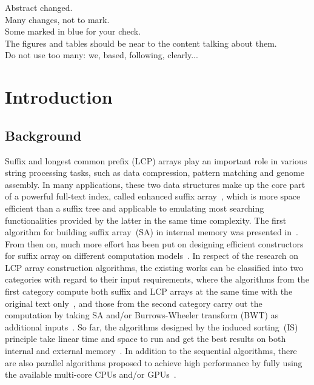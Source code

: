 \documentclass[10pt,journal,compsoc]{IEEEtran}
\begin{document}
\IEEEdisplaynontitleabstractindextext

\IEEEpeerreviewmaketitle

{\color{blue} 
Abstract changed. \\
Many changes, not to mark. \\
Some marked in blue for your check. \\
The figures and tables should be near to the content talking about them. \\
Do not use too many: we, based, following, clearly...  \\
}

\section{Introduction}\label{sec:introduction}

\subsection{Background} \label{sec:introduction:background}

Suffix and longest common prefix (LCP) arrays play an important role in various string processing tasks, such as data compression, pattern matching and genome assembly. In many applications, these two data structures make up the core part of a powerful full-text index, called enhanced suffix array~\cite{Abouelhodaa2004}, which is more space efficient than a suffix tree and applicable to emulating most searching functionalities provided by the latter in the same time complexity. The first algorithm for building suffix array~(SA) in internal memory was presented in~\cite{Manber1993}. From then on, much more effort has been put on designing efficient constructors for suffix array on different computation models~\cite{Karkkainen2003, Ko2003, Kim2003, Nong11, Dementiev2008, Ferragina2012, Manzini2004, Bingmann12, Karkkainen2014, Nong14, Nong15}. In respect of the research on LCP array construction algorithms, the existing works can be classified into two categories with regard to their input requirements, where the algorithms from the first category compute both suffix and LCP arrays at the same time with the original text only~\cite{Fischer11, Bingmann12, Flick2015}, and those from the second category carry out the computation by taking SA and/or Burrows-Wheeler transform (BWT) as additional inputs~\cite{Kasai2001,Karkkainen2009, Fischer11, Puglisi2008, Deo2013}. So far, the algorithms designed by the induced sorting~(IS) principle take linear time and space to run and get the best results on both internal and external memory~\cite{Nong11, esais}. In addition to the sequential algorithms, there are also parallel algorithms proposed to achieve high performance by fully using the available multi-core CPUs and/or GPUs~\cite{Osipov2012, Deo2013, Wang2015, Karkkainen2015, Karkkainen2016}.
\end{document}

